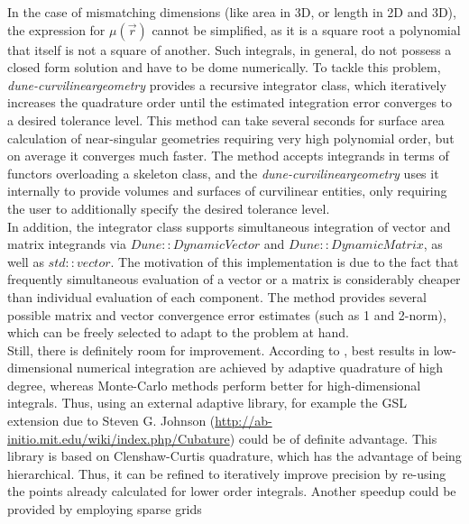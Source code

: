 \noindent
In the case of mismatching dimensions (like area in 3D, or length in 2D and 3D), the expression for $\mu(\vec{r})$ cannot be simplified, as it is a square root a polynomial that itself is not a square of another. Such integrals, in general, do not possess a closed form solution and have to be dome numerically. To tackle this problem, \textit{dune-curvilineargeometry} provides a recursive integrator class, which iteratively increases the quadrature order until the estimated integration error converges to a desired tolerance level. This method can take several seconds for surface area calculation of near-singular geometries requiring very high polynomial order, but on average it converges much faster. The method accepts integrands in terms of functors overloading a skeleton class, and the \textit{dune-curvilineargeometry} uses it internally to provide volumes and surfaces of curvilinear entities, only requiring the user to additionally specify the desired tolerance level. \\

\noindent
In addition, the integrator class supports simultaneous integration of vector and matrix integrands via $Dune::DynamicVector$ and $Dune::DynamicMatrix$, as well as $std::vector$. The motivation of this implementation is due to the fact that frequently simultaneous evaluation of a vector or a matrix is considerably cheaper than individual evaluation of each component. The method provides several possible matrix and vector convergence error estimates (such as 1 and 2-norm), which can be freely selected to adapt to the problem at hand.\\

\noindent
Still, there is definitely room for improvement. According to \cite{schurer2003}, best results in low-dimensional numerical integration are achieved by adaptive quadrature of high degree, whereas Monte-Carlo methods perform better for high-dimensional integrals. Thus, using an external adaptive library, for example the GSL extension due to Steven G. Johnson (\url{http://ab-initio.mit.edu/wiki/index.php/Cubature}) could be of definite advantage. This library is based on Clenshaw-Curtis quadrature, which has the advantage of being hierarchical. Thus, it can be refined to iteratively improve precision by re-using the points already calculated for lower order integrals. Another speedup could be provided by employing sparse grids \cite{petras2000} \\


